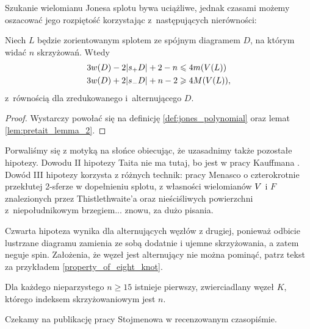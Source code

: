 Szukanie wielomianu Jonesa splotu bywa uciążliwe,
jednak czasami możemy oszacować jego rozpiętość korzystając z~następujących nierówności:

\begin{corollary}
    Niech $L$ będzie zorientowanym splotem ze spójnym diagramem $D$, na którym widać $n$ skrzyżowań.
    Wtedy
    \begin{align}
        3w(D) - 2|s_+D| + 2 - n & \leqslant 4 m(V(L)) \\
        3w(D) + 2|s_-D| + n - 2 & \geqslant 4 M(V(L)),
    \end{align}
    z~równością dla zredukowanego i~alternującego $D$.
\end{corollary}

\begin{proof}
    Wystarczy powołać się na definicję \ref{def:jones_polynomial} oraz lemat \ref{lem:pretait_lemma_2}.
\end{proof}

Porwaliśmy się z motyką na słońce obiecując, że uzasadnimy także pozostałe hipotezy.
Dowodu II hipotezy Taita nie ma tutaj, bo jest w pracy Kauffmana \cite{kauffman1987}.
Dowód III hipotezy korzysta z różnych technik: pracy Menasco o czterokrotnie przekłutej 2-sferze w dopełnieniu splotu, z własności wielomianów $V$ i $F$ znalezionych przez Thistlethwaite'a oraz nieściśliwych powierzchni z~niepołudnikowym brzegiem... znowu, za dużo pisania.

Czwarta hipoteza wynika dla alternujących węzłów z drugiej, ponieważ odbicie lustrzane diagramu zamienia ze sobą dodatnie i ujemne skrzyżowania, a zatem neguje spin.
Założenia, że węzeł jest alternujący nie można pominąć, patrz tekst za przykładem \ref{property_of_eight_knot}.

\begin{proposition}
    Dla każdego nieparzystego $n \ge 15$ istnieje pierwszy, zwierciadlany węzeł $K$, którego indeksem skrzyżowaniowym jest $n$.
\end{proposition}

Czekamy na publikację pracy Stojmenowa \cite{stoimenow2007} w recenzowanym czasopiśmie.
%

%


